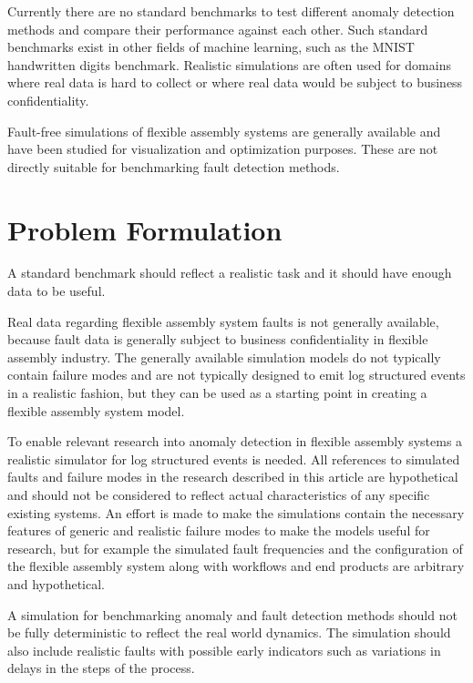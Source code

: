 \documentclass[journal]{IEEEtran}
\begin{document}
Currently there are no standard benchmarks to test
different anomaly detection methods and compare their performance against each other. Such standard benchmarks exist in other fields of machine learning,
such as the MNIST handwritten digits benchmark\cite{lecun-mnisthandwrittendigit-2010}. Realistic simulations are often used\cite{jager2014assessing} for domains where
real data is hard to collect or where real data would be subject to business confidentiality.

Fault-free simulations of flexible assembly systems are generally available\cite{giulio} and have been studied for visualization and optimization purposes.
These are not directly suitable for benchmarking fault detection methods.

\section{Problem Formulation}

A standard benchmark should reflect a realistic task and it should have enough data to be useful.

Real data regarding flexible assembly system faults is
not generally available, because fault data is generally subject to business confidentiality in flexible assembly industry.
The generally available simulation models do not typically contain failure modes and are not typically designed to emit
log structured events in a realistic fashion, but they can be used as a starting point in creating a flexible assembly system model.

To enable relevant research into anomaly detection in flexible assembly systems a realistic simulator for log structured events is needed.
All references to simulated faults and failure modes in the research described in this article are hypothetical and should not be considered to
reflect actual characteristics of any specific existing systems. An effort is made to make the simulations contain the necessary features of
generic and realistic failure modes to make the models useful for research, but for example the simulated fault frequencies and the configuration
of the flexible assembly system along with workflows and end products are arbitrary and hypothetical.

A simulation for benchmarking anomaly and fault detection methods should not be fully deterministic to reflect the real world dynamics. The simulation should also
include realistic faults with possible early indicators such as variations in delays in the steps of the process.
\end{document}
